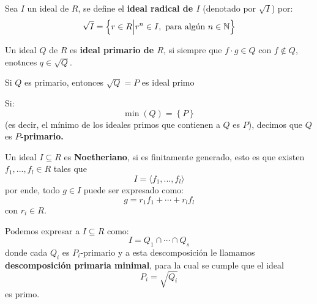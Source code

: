 \documentclass[12pt]{report}
\newcounter{it}
\theoremstyle{largebreak}
\begin{document}
    \begin{mydef}
        Sea $I$ un ideal de $R$, se define el \textbf{ideal radical de $I$} (denotado por $\sqrt{I}$) por:
        \begin{equation*}
            \sqrt{I}=\left\{r\in R\Big|r^n\in I,\textup{ para algún }n\in\mathbb{N} \right\}
        \end{equation*}
    \end{mydef}

    \begin{mydef}
        Un ideal $Q$ de $R$ es \textbf{ideal primario de $R$}, si siempre que $f\cdot g\in Q$ con $f\notin Q$, enotnces $q\in\sqrt{Q}$.
    \end{mydef}

    \begin{obs}
        Si $Q$ es primario, entonces $\sqrt{Q}=P$ es ideal primo
    \end{obs}

    \begin{mydef}
        Si:
        \begin{equation*}
            \min\left(Q\right)=\left\{P \right\}
        \end{equation*}
        (es decir, el mínimo de los ideales primos que contienen a $Q$ es $P$), decimos que $Q$ es \textbf{$P$-primario.}
    \end{mydef}

    \begin{mydef}
        Un ideal $I\subseteq R$ es \textbf{Noetheriano}, si es finitamente generado, esto es que existen $f_1,...,f_l\in R$ tales que
        \begin{equation*}
            I=\langle f_1,...,f_l\rangle
        \end{equation*}
        por ende, todo $g\in I$ puede ser expresado como:
        \begin{equation*}
            g=r_1f_1+\cdots+r_lf_l
        \end{equation*}
        con $r_i\in R$.
    \end{mydef}

    \begin{theor}
        Podemos expresar a $I\subseteq R$ como:
        \begin{equation*}
            I=Q_1\cap\cdots\cap Q_s
        \end{equation*}
        donde cada $Q_i$ es $P_i$-primario y a esta descomposición le llamamos \textbf{descomposición primaria minimal}, para la cual se cumple que el ideal
        \begin{equation*}
            P_i=\sqrt{Q_i}
        \end{equation*}
        es primo.
    \end{theor}
\end{document}
